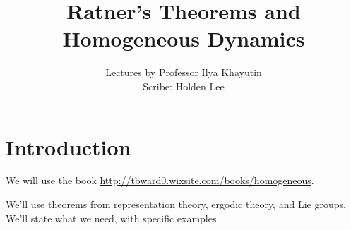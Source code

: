 \def\filepath{templates}








\def\name{Ratner's Theorems and Homogeneous Dynamics}


\pagestyle{fancy}
\chead{} 
\lfoot{} 
\cfoot{\thepage} 
\rfoot{} %
\renewcommand{\headrulewidth}{.3pt} 
\setlength\voffset{0in}


%
\title{Ratner's Theorems and Homogeneous Dynamics}
\author{Lectures by Professor Ilya Khayutin\\ Scribe: Holden Lee}
\maketitle


\tableofcontents


\chapter*{Introduction}

We will use the book \url{http://tbward0.wixsite.com/books/homogeneous}.

We'll use theorems from representation theory, ergodic theory, and Lie groups. We'll state what we need, with specific examples.













%

%
%

\printnomenclature
\printindex
